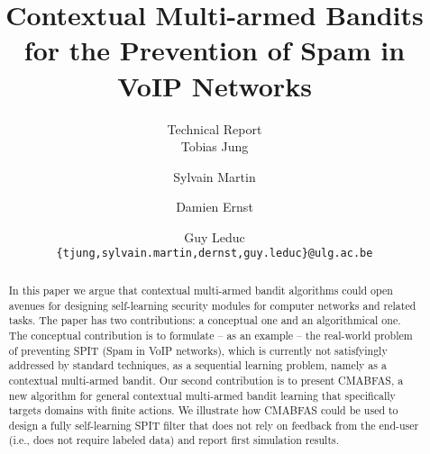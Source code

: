 \documentclass{llncs}
\begin{document}




\title{\vspace*{-1.3cm} Contextual Multi-armed Bandits for the Prevention of Spam in VoIP Networks}

\author{ Technical Report \\ \medskip Tobias Jung \and Sylvain Martin \and Damien Ernst \and Guy Leduc\\
{\tt \{tjung,sylvain.martin,dernst,guy.leduc\}@ulg.ac.be}}




\maketitle

\begin{abstract}
In this paper we argue that contextual multi-armed bandit algorithms
could open avenues for designing self-learning security modules for 
computer networks and related tasks. The paper has two contributions:
a conceptual one and an algorithmical one. The conceptual contribution
is to formulate -- as an example -- the real-world problem of preventing SPIT (Spam in 
VoIP networks), which is currently not satisfyingly addressed by standard
techniques, as a sequential learning problem, namely as a contextual 
multi-armed bandit. Our second contribution is to present CMABFAS, 
a new algorithm for general contextual multi-armed bandit learning that
specifically targets domains with finite actions. We illustrate how CMABFAS
could be used to design a fully self-learning SPIT filter that does not
rely on feedback from the end-user (i.e., does not require labeled data)
and report first simulation results.
\end{abstract}
\end{document}
